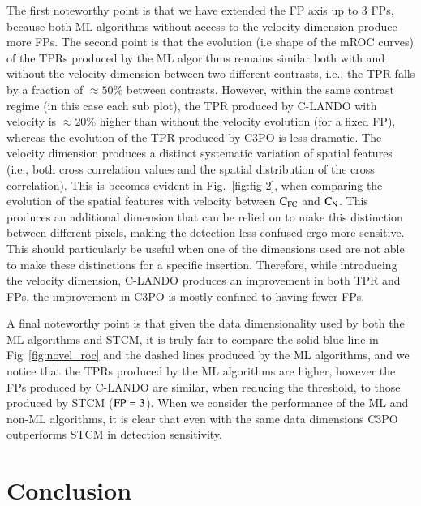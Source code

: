 \documentclass{aa}
\begin{document}
The first noteworthy point is that we have extended the FP axis up to $3$ FPs, because both ML algorithms without access to the velocity dimension produce more FPs.
The second point is that the evolution (i.e shape of the mROC curves) of the TPRs produced by the ML algorithms remains similar both with and without the velocity dimension between two different contrasts, i.e., the TPR falls by a fraction of $\approx 50\%$ between contrasts.
However, within the same contrast regime (in this case each sub plot), the TPR produced by C-LANDO with velocity is $\approx 20\%$ higher than without the velocity evolution (for a fixed FP), whereas the evolution of the TPR produced by C3PO is less dramatic.
The velocity dimension produces a distinct systematic variation of spatial features (i.e., both cross correlation values and the spatial distribution of the cross correlation).
This is becomes evident in Fig.~\ref{fig:fig-2}, when comparing the evolution of the spatial features with velocity between $\rm{C_{FC}}$ and $\rm{C_N}$.
This produces an additional dimension that can be relied on to make this distinction between different pixels, making the detection less confused ergo more sensitive.
This should particularly be useful when one of the dimensions used are not able to make these distinctions for a specific insertion.
Therefore, while introducing the velocity dimension, C-LANDO produces an improvement in both TPR and FPs, the improvement in C3PO is mostly confined to having fewer FPs.

A final noteworthy point is that given the data dimensionality used by both the ML algorithms and STCM, it is truly fair to compare the solid blue line in Fig~\ref{fig:novel_roc} and the dashed lines produced by the ML algorithms, and we notice that the TPRs produced by the ML algorithms are higher, however the FPs produced by C-LANDO are similar, when reducing the threshold, to those produced by STCM (${\rm FP}=3$). 
When we consider the performance of the ML and non-ML algorithms, it is clear that even with the same data dimensions C3PO outperforms STCM in detection sensitivity.



\section{Conclusion}
\end{document}
